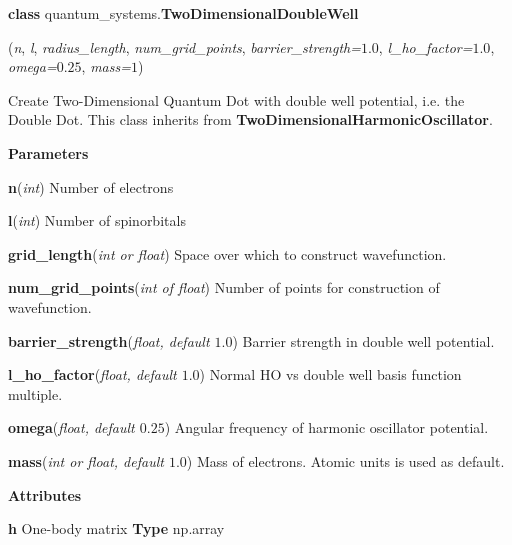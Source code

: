 
\begin{tcolorbox}
    {\selectfont
    \textbf{class} quantum\_systems.\textbf{TwoDimensionalDoubleWell}

    \hspace{1em}(\emph{n}, \emph{l}, \emph{radius\_length}, \emph{num\_grid\_points}, 
    \emph{barrier\_strength=}$1.0$, \emph{l\_ho\_factor=$1.0$}, 
    \emph{omega=$0.25$}, \emph{mass=$1$})

    \vspace{1em}
    Create Two-Dimensional Quantum Dot with double well potential, i.e. the Double Dot.
    This class inherits from \textbf{TwoDimensionalHarmonicOscillator}.
    \vspace{1em}

    \textbf{Parameters}

    \hspace{2em}\textbf{n}(\emph{int}) Number of electrons
    
    \hspace{2em}\textbf{l}(\emph{int}) Number of spinorbitals
    
    \hspace{2em}\textbf{grid\_length}(\emph{int or float}) Space over which to 
        construct wavefunction.
    
    \hspace{2em}\textbf{num\_grid\_points}(\emph{int of float}) Number of 
        points for construction of wavefunction.

    \hspace{2em}\textbf{barrier\_strength}(\emph{float, default $1.0$}) Barrier strength 
        in double well potential.
    
    \hspace{2em}\textbf{l\_ho\_factor}(\emph{float, default $1.0$}) Normal HO vs double
        well basis function multiple.

    \hspace{2em}\textbf{omega}(\emph{float, default $0.25$}) Angular frequency of
        harmonic oscillator potential.
    
    \hspace{2em}\textbf{mass}(\emph{int or float, default $1.0$}) Mass of electrons.
        Atomic units is used as default.

    \vspace{1em}
    \textbf{Attributes}

    \hspace{2em} \textbf{h}
    One-body matrix 
    \textbf{Type} np.array
    
}
\end{tcolorbox}
